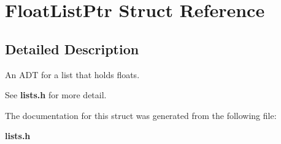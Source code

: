 \section{Float\-List\-Ptr Struct Reference}
\label{structFloatListPtr}


\subsection{Detailed Description}
An ADT for a list that holds floats. 

See {\bf lists.h} for more detail. 



The documentation for this struct was generated from the following file:\begin{CompactItemize}
\item 
{\bf lists.h}\end{CompactItemize}
